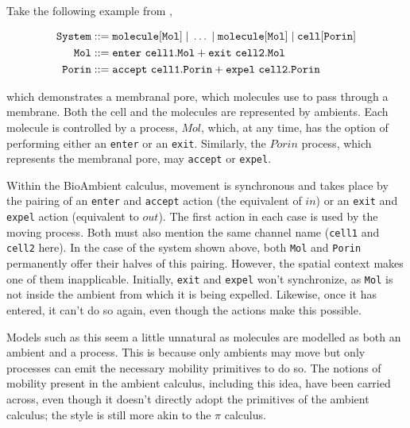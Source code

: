 Take the following example from \cite{cardelli:bioambients},

\begin{equation}
\begin{aligned}
\mathtt{System} & ::= \mathtt{molecule[Mol] \pc \dots \pc molecule[Mol] \pc
 cell[Porin]} \\
\mathtt{Mol} & ::= \mathtt{enter\ cell1.Mol + exit\ cell2 . Mol} \\
\mathtt{Porin} & ::= \mathtt{accept\ cell1.Porin + expel\ cell2.Porin}
\end{aligned}
\end{equation}

\noindent which demonstrates a membranal pore, which molecules use to
pass through a membrane.  Both the cell and the molecules are
represented by ambients.  Each molecule is controlled by a process,
$Mol$, which, at any time, has the option of performing either an
\texttt{enter} or an \texttt{exit}.  Similarly, the $Porin$ process,
which represents the membranal pore, may \texttt{accept} or
\texttt{expel}.

Within the BioAmbient calculus, movement is synchronous and takes place
by the pairing of an \texttt{enter} and \texttt{accept} action (the
equivalent of $in$) or an \texttt{exit} and \texttt{expel} action
(equivalent to $out$).  The first action in each case is used by the
moving process.  Both must also mention the same channel name
(\texttt{cell1} and \texttt{cell2} here).  In the case of the system
shown above, both \texttt{Mol} and \texttt{Porin} permanently offer
their halves of this pairing.  However, the spatial context makes one of
them inapplicable.  Initially, \texttt{exit} and \texttt{expel} won't
synchronize, as \texttt{Mol} is not inside the ambient from which it is
being expelled.  Likewise, once it has entered, it can't do so again,
even though the actions make this possible.

Models such as this seem a little unnatural as molecules are modelled as
both an ambient and a process.  This is because only ambients may move
but only processes can emit the necessary mobility primitives to do so.
The notions of mobility present in the ambient calculus, including this
idea, have been carried across, even though it doesn't directly adopt
the primitives of the ambient calculus; the style is still more akin to
the $\pi$ calculus.

